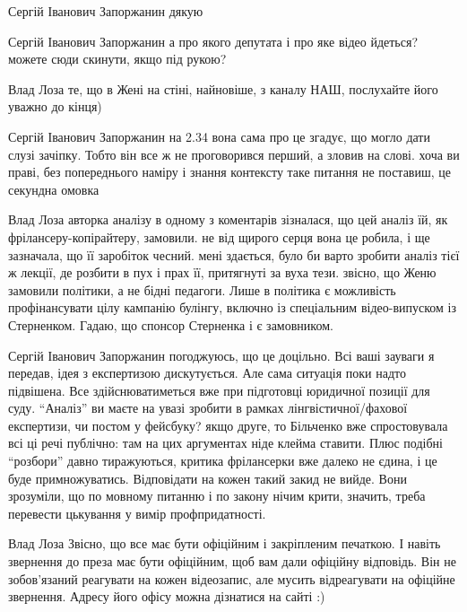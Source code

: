 \begin{itemize}
\begin{itemize}

Сергій Іванович Запоржанин дякую


Сергій Іванович Запоржанин а про якого депутата і про яке відео йдеться? можете
сюди скинути, якщо під рукою?


Влад Лоза те, що в Жені на стіні, найновіше, з каналу НАШ, послухайте його уважно до кінця)


Сергій Іванович Запоржанин на 2.34 вона сама про це згадує, що могло дати слузі
зачіпку. Тобто він все ж не проговорився перший, а зловив на слові. хоча ви
праві, без попереднього наміру і знання контексту таке питання не поставиш, це
секундна омовка


Влад Лоза авторка аналізу в одному з коментарів зізналася, що цей аналіз їй, як
фрілансеру-копірайтеру, замовили. не від щирого серця вона це робила, і ще
зазначала, що її заробіток чесний. мені здається, було би варто зробити аналіз
тієї ж лекції, де розбити в пух і прах її, притягнуті за вуха тези. звісно, що
Женю замовили політики, а не бідні педагоги. Лише в політика є можливість
профінансувати цілу кампанію булінгу, включно із спеціальним відео-випуском із
Стерненком. Гадаю, що спонсор Стерненка і є замовником.


Сергій Іванович Запоржанин погоджуюсь, що це доцільно. Всі ваші зауваги я
передав, ідея з експертизою дискутується. Але сама ситуація поки надто
підвішена. Все здійснюватиметься вже при підготовці юридичної позиції для суду.
\enquote{Аналіз} ви маєте на увазі зробити в рамках лінгвістичної/фахової експертизи,
чи постом у фейсбуку? якщо друге, то Більченко вже спростовувала всі ці речі
публічно: там на цих аргументах ніде клейма ставити. Плюс подібні \enquote{розбори}
давно тиражуються, критика фрілансерки вже далеко не єдина, і це буде
примножуватись. Відповідати на кожен такий закид не вийде. Вони зрозуміли, що
по мовному питанню і по закону нічим крити, значить, треба перевести цькування
у вимір профпридатності.


Влад Лоза Звісно, що все має бути офіційним і закріпленим печаткою. І навіть
звернення до преза має бути офіційним, щоб вам дали офіційну відповідь. Він не
зобов'язаний реагувати на кожен відеозапис, але мусить відреагувати на офіційне
звернення. Адресу його офісу можна дізнатися на сайті :)


\end{itemize}
\end{itemize}
